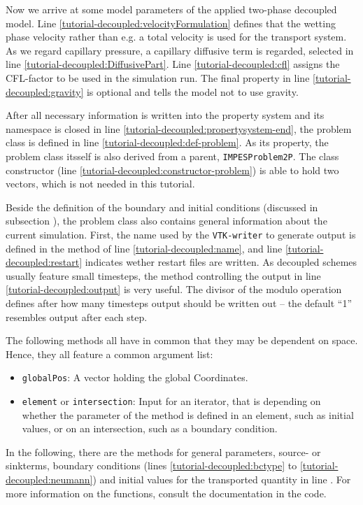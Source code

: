 Now we arrive at some model parameters of the applied two-phase decoupled 
model. Line \ref{tutorial-decoupled:velocityFormulation} defines that the 
wetting phase velocity rather than e.g. a total velocity is used for the 
transport system. As we regard capillary pressure, a capillary diffusive 
term is regarded, selected in line \ref{tutorial-decoupled:DiffusivePart}.
Line \ref{tutorial-decoupled:cfl} assigns the CFL-factor to be used in the
simulation run. The final property in line \ref{tutorial-decoupled:gravity} 
is optional and tells the model not to use gravity.

After all necessary information is written into the property system and 
its namespace is closed in line \ref{tutorial-decoupled:propertysystem-end},
the problem class is defined in line \ref{tutorial-decoupled:def-problem}. 
As its property, the problem class itsself is also derived from a parent, 
\texttt{IMPESProblem2P}. The class constructor (line 
\ref{tutorial-decoupled:constructor-problem}) is able to hold two vectors,
which is not needed in this tutorial.

Beside the definition of the boundary and initial conditions (discussed in 
subsection \label{decoupled-problem:boundary}), the problem class also contains
general information about the current simulation. First, the name used by
the \texttt{VTK-writer} to generate output is defined in the method of line
\ref{tutorial-decoupled:name}, and line \ref{tutorial-decoupled:restart} indicates
wether restart files are written. As decoupled schemes usually feature small 
timesteps, the method controlling the output in line \ref{tutorial-decoupled:output}
is very useful. The divisor of the modulo operation defines after how many timesteps
output should be written out -- the default ``1'' resembles output after each 
step.

The following methods all have in common that they may be dependent on space.
Hence, they all feature a common argument list:
\begin{itemize}
 \item \texttt{globalPos}: A vector holding the global Coordinates.
 \item \texttt{element} or \texttt{intersection}: Input for an iterator, that is 
    depending on whether the parameter of the method is defined in an element, such as 
    initial values, or on an intersection, such as a boundary condition.
\end{itemize}
In the following, there are the methods for general parameters, source- or
sinkterms, boundary conditions (lines \ref{tutorial-decoupled:bctype} to
\ref{tutorial-decoupled:neumann}) and initial values for the transported
quantity in line \label{tutorial-decoupled:init}. For more information
on the functions, consult the documentation in the code.

